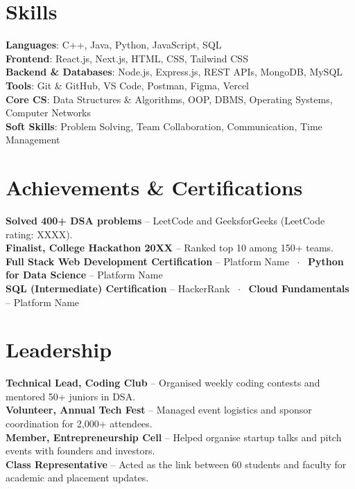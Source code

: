 \documentclass[letterpaper,10pt]{article}
\begin{document}
\section{Skills}
\small{
\textbf{Languages}: C++, Java, Python, JavaScript, SQL \\
\textbf{Frontend}: React.js, Next.js, HTML, CSS, Tailwind CSS \\
\textbf{Backend \& Databases}: Node.js, Express.js, REST APIs, MongoDB, MySQL \\
\textbf{Tools}: Git \& GitHub, VS Code, Postman, Figma, Vercel \\
\textbf{Core CS}: Data Structures \& Algorithms, OOP, DBMS, Operating Systems, Computer Networks \\
\textbf{Soft Skills}: Problem Solving, Team Collaboration, Communication, Time Management
}

\section{Achievements \& Certifications}
\small{
\textbf{Solved 400+ DSA problems} -- LeetCode and GeeksforGeeks (LeetCode rating: XXXX). \\
\textbf{Finalist, College Hackathon 20XX} -- Ranked top 10 among 150+ teams. \\
\textbf{Full Stack Web Development Certification} -- Platform Name \ $\cdot$ \ \textbf{Python for Data Science} -- Platform Name \\
\textbf{SQL (Intermediate) Certification} -- HackerRank \ $\cdot$ \ \textbf{Cloud Fundamentals} -- Platform Name
}

\section{Leadership}
\small{
\textbf{Technical Lead, Coding Club} -- Organised weekly coding contests and mentored 50+ juniors in DSA. \\
\textbf{Volunteer, Annual Tech Fest} -- Managed event logistics and sponsor coordination for 2,000+ attendees. \\
\textbf{Member, Entrepreneurship Cell} -- Helped organise startup talks and pitch events with founders and investors. \\
\textbf{Class Representative} -- Acted as the link between 60 students and faculty for academic and placement updates.
}
\end{document}
